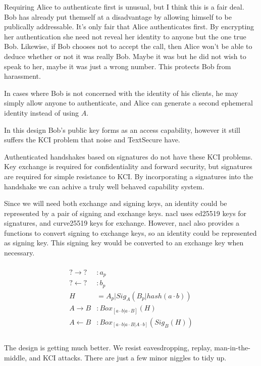 \documentclass[12pt]{article}
\begin{document}
Requiring Alice to authenticate first is unusual, but
I think this is a fair deal. Bob has already put themself
at a disadvantage by allowing himself to be publically
addressable. It's only fair that Alice authenticates first.
By encrypting her authentication she need not reveal her
identity to anyone but the one true Bob. Likewise, if Bob chooses
not to accept the call, then Alice won't be able to deduce
whether or not it was really Bob. Maybe it was but he did not wish
to speak to her, maybe it was just a wrong number. This protects
Bob from harassment.

In cases where Bob is not concerned with the identity of his clients,
he may simply allow anyone to authenticate, and Alice can
generate a second ephemeral identity instead of using $A$.

In this design Bob's public key forms as an access capability,
however it still suffers the KCI problem that noise and TextSecure have.

Authenticated handshakes based on signatures do not have these
KCI problems. Key exchange is required for confidentiality and
forward security, but signatures are required for simple resistance
to KCI. By incorporating a signatures into the handshake we can
achive a truly well behaved capability system.

Since we will need both exchange and signing keys,
an identity could be represented by a pair of signing and exchange keys.
nacl uses ed25519 keys for signatures, and
curve25519 keys for exchange. However, nacl also provides
a functions to convert signing to exchange keys,
so an identity could be represented as signing key.
This signing key would be converted to an exchange key when necessary.

$$
\begin{align*}
\\
    ? \to ? &: a_p   \\
    ? \gets ? &: b_p \\
    H &= A_{p}|Sig_A(B_p|hash(a \cdot b)) \\
    A \to B &: Box_{[a \cdot b | a \cdot B]}(H)\\
    A \gets B &: Box_{[a \cdot b | a \cdot B | A \cdot b]}(Sig_B(H) )\\
\\
\end{align*}
$$

The design is getting much better. We resist eavesdropping, replay,
man-in-the-middle, and KCI attacks. There are just a few minor
niggles to tidy up.
\end{document}
